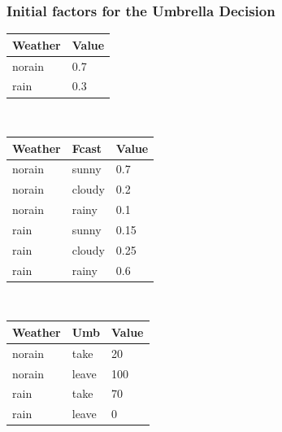 \documentclass[12pt]{beamer} %
\begin{document}
\begin{frame}
\frametitle{Initial factors for the Umbrella Decision}
\begin{tabular}{|l|l|}\hline
Weather & Value\\\hline
norain & 0.7\\
rain & 0.3\\\hline
\end{tabular}
~
\begin{tabular}{|ll|l|}\hline
Weather & Fcast & Value\\\hline
norain & sunny & 0.7\\
norain & cloudy & 0.2\\
norain & rainy & 0.1\\
rain & sunny & 0.15\\
rain & cloudy & 0.25\\
rain & rainy & 0.6\\\hline
\end{tabular}
\\[1em]
\begin{tabular}{|ll|l|}\hline
Weather & Umb & Value\\\hline
norain & take & 20 \\
norain & leave & 100\\
rain & take & 70\\
rain & leave & 0\\\hline
\end{tabular}
\end{frame}
\end{document}
